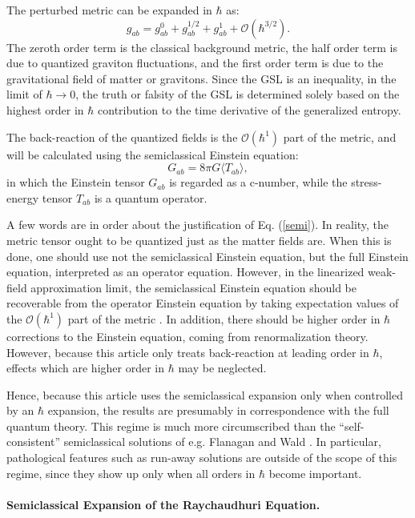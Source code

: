 \documentclass{article}
\begin{document}
The perturbed metric can be expanded in $\hbar$ as:
\begin{equation}
g_{ab} = g_{ab}^0 + g_{ab}^{1/2} + g_{ab}^1 + \mathcal{O}(\hbar^{3/2}).
\end{equation}
The zeroth order term is the classical background metric, the half order term is due to quantized graviton fluctuations, and the first order term is due to the gravitational field of matter or gravitons.  Since the GSL is an inequality, in the limit of $\hbar \to 0$, the truth or falsity of the GSL is determined solely based on the highest order in $\hbar$ contribution to the time derivative of the generalized entropy.

The back-reaction of the quantized fields is the $\mathcal{O}(\hbar^1)$ part of the metric, and will be calculated using the semiclassical Einstein equation:
\begin{equation}\label{semi}
G_{ab} = 8\pi G \langle T_{ab} \rangle,
\end{equation}
in which the Einstein tensor $G_{ab}$ is regarded as a c-number, while the stress-energy tensor $T_{ab}$ is a quantum operator.

A few words are in order about the justification of Eq. (\ref{semi}).  In reality, the metric tensor ought to be quantized just as the matter fields are.  When this is done, one should use not the semiclassical Einstein equation, but the full Einstein equation, interpreted as an operator equation.  However, in the linearized weak-field approximation limit, the semiclassical Einstein equation should be recoverable from the operator Einstein equation by taking expectation values of the $\mathcal{O}(\hbar^1)$ part of the metric \cite{10proofs}.  In addition, there should be higher order in $\hbar$ corrections to the Einstein equation, coming from renormalization theory.  However, because this article only treats back-reaction at leading order in $\hbar$, effects which are higher order in $\hbar$ may be neglected.

Hence, because this article uses the semiclassical expansion only when controlled by an $\hbar$ expansion, the results are presumably in correspondence with the full quantum theory.  This regime is much more circumscribed than the ``self-consistent'' semiclassical solutions of e.g. Flanagan and Wald \cite{FW}.  In particular, pathological features such as run-away solutions are outside of the scope of this regime, since they show up only when all orders in $\hbar$ become important.

\paragraph{Semiclassical Expansion of the Raychaudhuri Equation.}
\end{document}
